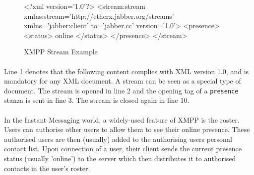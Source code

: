 \begin{figure}[H]
\begin{listing}{1}
<?xml version='1.0'?>
<stream:stream 
      xmlns:stream='http://etherx.jabber.org/streams' 
      xmlns='jabber:client' to='jabber.cc' version='1.0'>
  <presence>
    <status>
      online
    </status>
  </presence>
</stream>
\end{listing}
\caption{XMPP Stream Example}
\label{fig:streamExample}
\end{figure}

\paragraph{}
Line 1 denotes that the following content complies with XML version 1.0, and is mandatory for any XML document. A stream can be seen as a special type of document. The stream is opened in line 2 and the opening tag of a \texttt{presence} stanza is sent in line 3. The stream is closed again in line 10.
\paragraph{}
In the Instant Messaging world, a widely-used feature of XMPP is the roster. Users can authorise other users to allow them to see their online presence. These authorised users are then (usually) added to the authorising users personal contact list. Upon connection of a user, their client sends the current presence status (usually 'online') to the server which then distributes it to authorised contacts in the user's roster.
